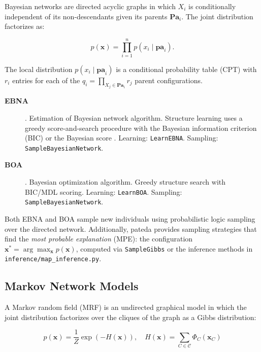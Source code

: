 \documentclass[a4paper,11pt]{article}
\begin{document}
Bayesian networks \citep{Lauritzen_and_Spiegelhalter:1988} are directed acyclic
graphs in which $X_i$ is conditionally independent of its non-descendants given
its parents $\mathbf{Pa}_i$.  The joint distribution factorizes as:

\begin{equation}
  p(\mathbf{x}) = \prod_{i=1}^{n} p(x_i \mid \mathbf{pa}_i).
\end{equation}

The local distribution $p(x_i \mid \mathbf{pa}_i)$ is a conditional probability
table (CPT) with $r_i$ entries for each of the $q_i = \prod_{X_j \in
\mathbf{Pa}_i} r_j$ parent configurations.

\begin{description}
  \item[\textbf{EBNA}] \citep{Etxeberria_and_Larranhaga:1999}.
    Estimation of Bayesian network algorithm.  Structure learning uses a
    greedy score-and-search procedure with the Bayesian information criterion
    (BIC) \citep{Schwarz:1978} or the Bayesian score
    \citep{Cooper_and_Herskovits:1992}.
    Learning: \texttt{LearnEBNA}. Sampling: \texttt{SampleBayesianNetwork}.

  \item[\textbf{BOA}] \citep{Pelikan_et_al:1999,Pelikan:2005}.
    Bayesian optimization algorithm.  Greedy structure search with BIC/MDL
    scoring.
    Learning: \texttt{LearnBOA}. Sampling: \texttt{SampleBayesianNetwork}.
\end{description}

Both EBNA and BOA sample new individuals using probabilistic logic sampling
over the directed network.  Additionally, pateda provides sampling strategies
that find the \emph{most probable explanation} (MPE): the configuration
$\mathbf{x}^* = \arg\max_\mathbf{x} p(\mathbf{x})$, computed via
\texttt{SampleGibbs} or the inference methods in \texttt{inference/map\_inference.py}.

\subsection{Markov Network Models}
\label{sec:markov}

A Markov random field (MRF) \citep{Hammersley_and_Clifford:1968} is an
undirected graphical model in which the joint distribution factorizes over the
cliques of the graph as a Gibbs distribution:

\begin{equation}
  p(\mathbf{x}) = \frac{1}{Z}\exp\!\left(-H(\mathbf{x})\right),\quad
  H(\mathbf{x}) = \sum_{C \in \mathcal{C}} \Phi_C(\mathbf{x}_C)
\end{equation}
\end{document}
